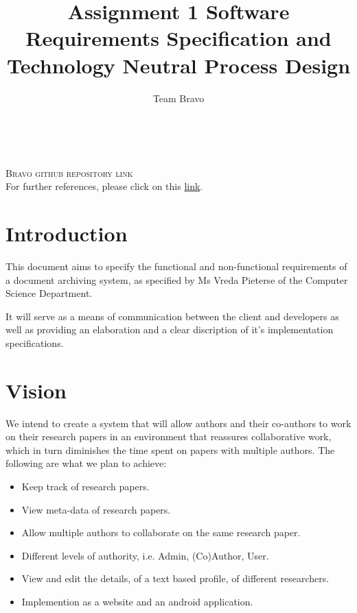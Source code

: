 \documentclass[11pt]{article}
\author{Team Bravo}
\title{Assignment 1 Software Requirements Specification and Technology Neutral Process Design}
\begin{document}
\setlength{\parskip}{6pt}



\renewcommand{\thesection}{\arabic{section}}
\newpage

\tableofcontents

\textsc{}\\[1cm]

\begin{center}
\textsc{\Large Bravo github repository link}\\[0.5cm]
For further references, please click on this \href{https://github.com/ish1993/Bravo}{link}.
\end{center}

\newpage

\section{Introduction}

This document aims to specify the functional and non-functional requirements of a document archiving system, as specified by Ms Vreda Pieterse of the Computer Science Department.

It will serve as a means of communication between the client and developers as well as providing an elaboration and a clear discription of it's implementation specifications.

\section{Vision}

We intend to create a system that will allow authors and their co-authors to work on their research papers in an environment that reassures collaborative work, which in turn diminishes the time spent on papers with multiple authors. The following are what we plan to achieve: 

\begin{itemize}
	\item Keep track of research papers.
	\item View meta-data of research papers. 
	\item Allow multiple authors to collaborate on the same research paper. 
	\item Different levels of authority, i.e. Admin, (Co)Author, User.
	\item View and edit the details, of a text based profile, of different researchers. 
	\item Implemention as a website and an android application.
\end{itemize} 
\end{document}
